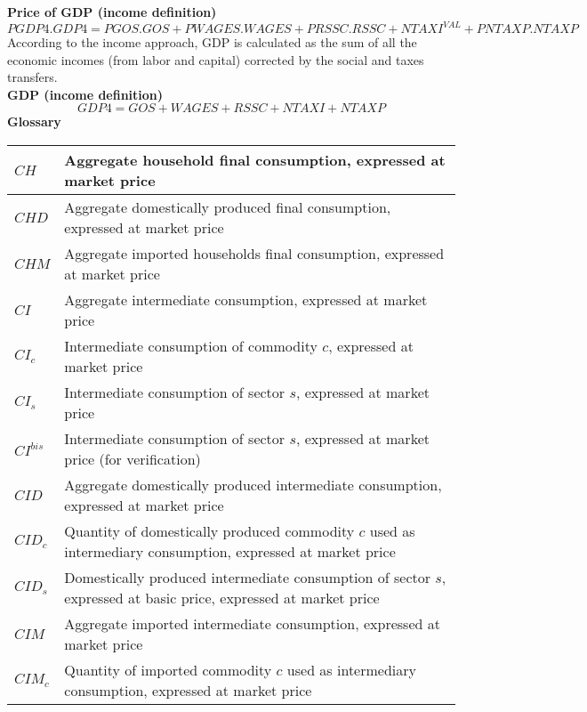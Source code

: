 \documentclass[12pt]{article}
\numberwithin{equation}{section}
\begin{document}
\noindent\textbf{Price of GDP (income definition)} \\
\begin{dmath}
PGDP4 . GDP4 = PGOS . GOS + PWAGES . WAGES + PRSSC . RSSC + NTAXI^{VAL} + PNTAXP . NTAXP
\end{dmath}
According to the income approach, GDP is calculated as the sum of all the economic incomes (from labor and capital) corrected by the social and taxes transfers. \\

\noindent\textbf{  GDP (income definition)} \\
\begin{dmath}
GDP4 = GOS + WAGES + RSSC + NTAXI + NTAXP
\end{dmath}
\newpage
        \Large\noindent\textbf{Glossary}
        \normalsize
        \begin{longtable}{@{}p{4cm}p{9cm}@{}} 
$CH$ & Aggregate household final consumption, expressed at market price \\
 \midrule 
$CHD$ & Aggregate domestically produced final consumption, expressed at market price \\
 \midrule 
$CHM$ & Aggregate imported households final consumption, expressed at market price \\
 \midrule 
$CI$ & Aggregate intermediate consumption, expressed at market price \\
 \midrule 
$CI_{c}$ & Intermediate consumption of commodity $c$, expressed at market price \\
 \midrule 
$CI_{s}$ & Intermediate consumption of sector $s$, expressed at market price \\
 \midrule 
$CI^{bis}$ & Intermediate consumption of sector $s$, expressed at market price (for verification) \\
 \midrule 
$CID$ & Aggregate domestically produced intermediate consumption, expressed at market price \\
 \midrule 
$CID_{c}$ & Quantity of domestically produced commodity $c$ used as intermediary consumption, expressed at market price \\
 \midrule 
$CID_{s}$ & Domestically produced intermediate consumption of sector $s$, expressed at basic price, expressed at market price \\
 \midrule 
$CIM$ &  Aggregate imported intermediate consumption, expressed at market price \\
 \midrule 
$CIM_{c}$ & Quantity of imported commodity $c$ used as intermediary consumption, expressed at market price \\

\end{longtable}
\end{document}
